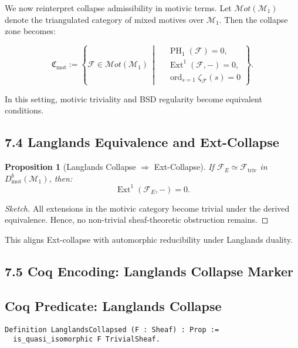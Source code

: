 \documentclass[11pt]{article}
\newtheorem{proposition}[theorem]{Proposition}
\DeclareMathOperator{\Ext}{Ext}
\DeclareMathOperator{\PH}{PH}
\newcommand{\ord}{\operatorname{ord}}
\begin{document}
We now reinterpret collapse admissibility in motivic terms. Let \( \mathcal{M}ot(\mathcal{M}_1) \) denote the triangulated category of mixed motives over \( \mathcal{M}_1 \). Then the collapse zone becomes:

\[
\mathfrak{C}_{\mathrm{mot}} := \left\{ \mathcal{F} \in \mathcal{M}ot(\mathcal{M}_1) \,\middle|\, 
\begin{aligned}
& \PH_1(\mathcal{F}) = 0, \\
& \Ext^1(\mathcal{F}, -) = 0, \\
& \ord_{s=1} \zeta_{\mathcal{F}}(s) = 0
\end{aligned}
\right\}.
\]

In this setting, motivic triviality and BSD regularity become equivalent conditions.

\subsection*{7.4 Langlands Equivalence and Ext-Collapse}

\begin{proposition}[Langlands Collapse \(\Rightarrow\) Ext-Collapse]
\label{prop:langlands-implies-ext}
If \( \mathcal{F}_E \simeq \mathcal{F}_{\text{triv}} \) in \( D^b_{\text{mot}}(\mathcal{M}_1) \), then:
\[
\Ext^1(\mathcal{F}_E, -) = 0.
\]
\end{proposition}

\begin{proof}[Sketch]
All extensions in the motivic category become trivial under the derived equivalence. Hence, no non-trivial sheaf-theoretic obstruction remains.
\end{proof}

This aligns Ext-collapse with automorphic reducibility under Langlands duality.

\subsection*{7.5 Coq Encoding: Langlands Collapse Marker}

\subsection*{Coq Predicate: Langlands Collapse}
\begin{lstlisting}[language=Coq]
Definition LanglandsCollapsed (F : Sheaf) : Prop :=
  is_quasi_isomorphic F TrivialSheaf.
\end{lstlisting}
\end{document}
